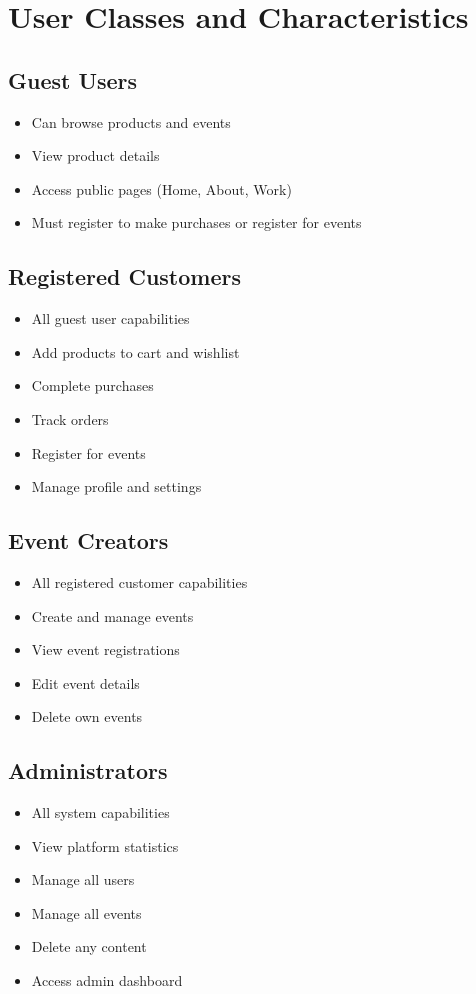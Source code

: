 \documentclass{scrreprt}
\begin{document}
\section{User Classes and Characteristics}

\subsection{Guest Users}
\begin{itemize}
\item Can browse products and events
\item View product details
\item Access public pages (Home, About, Work)
\item Must register to make purchases or register for events
\end{itemize}

\subsection{Registered Customers}
\begin{itemize}
\item All guest user capabilities
\item Add products to cart and wishlist
\item Complete purchases
\item Track orders
\item Register for events
\item Manage profile and settings
\end{itemize}

\subsection{Event Creators}
\begin{itemize}
\item All registered customer capabilities
\item Create and manage events
\item View event registrations
\item Edit event details
\item Delete own events
\end{itemize}

\subsection{Administrators}
\begin{itemize}
\item All system capabilities
\item View platform statistics
\item Manage all users
\item Manage all events
\item Delete any content
\item Access admin dashboard
\end{itemize}
\end{document}
